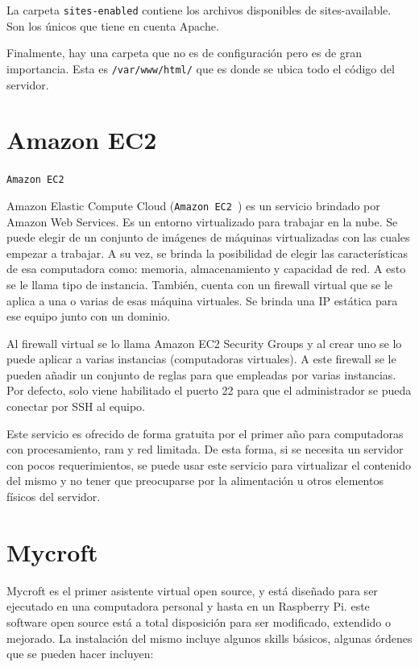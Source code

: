 La carpeta \lstinline[columns=fixed]{sites-enabled} contiene los archivos disponibles de sites-available. Son los únicos que tiene en cuenta Apache.

Finalmente, hay una carpeta que no es de configuración pero es de gran importancia. Esta es \lstinline[columns=fixed]{/var/www/html/} que es donde se ubica todo el código del servidor.

\section{Amazon EC2}

\lstinline[columns=fixed]{Amazon EC2}~\cite{AmazonEC2}

Amazon Elastic Compute Cloud (\lstinline[columns=fixed]{Amazon EC2}~\cite{AmazonEC2}) es un servicio brindado por Amazon Web Services. Es un entorno virtualizado para trabajar en la nube. Se puede elegir de un conjunto de imágenes de máquinas virtualizadas con las cuales empezar a trabajar. A su vez, se brinda la posibilidad de elegir las características de esa computadora como: memoria, almacenamiento y capacidad de red. A esto se le llama tipo de instancia. También, cuenta con un firewall virtual que se le aplica a una o varias de esas máquina virtuales. Se brinda una IP estática para ese equipo junto con un dominio. 

Al firewall virtual se lo llama Amazon EC2 Security Groups y al crear uno se lo puede aplicar a varias instancias (computadoras virtuales). A este firewall se le pueden añadir un conjunto de reglas para que empleadas por varias instancias. Por defecto, solo viene habilitado el puerto 22 para que el administrador se pueda conectar por SSH al equipo.

Este servicio es ofrecido de forma gratuita por el primer año para computadoras con procesamiento, ram y red limitada. De esta forma, si se necesita un servidor con pocos requerimientos, se puede usar este servicio para virtualizar el contenido del mismo y no tener que preocuparse por la alimentación u otros elementos físicos del servidor.

\section{Mycroft}
Mycroft es el primer asistente virtual open source, y está diseñado para ser ejecutado en una computadora personal y hasta en un Raspberry Pi. este software open source está a total disposición para ser modificado, extendido o mejorado. 
La instalación del mismo incluye algunos skills básicos, algunas órdenes que se pueden hacer incluyen:

